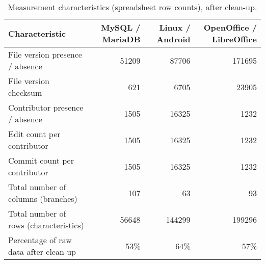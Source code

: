 \begin{table}[H]
\caption{Measurement characteristics (spreadsheet row counts), after clean-up.}
\label{table:ch4_cleanup} 
\centering
\begin{tabu} to 
  \toprule
  Characteristic & MySQL / MariaDB & Linux / Android & OpenOffice / LibreOffice \\
  \midrule
  File version presence / absence & \num{51209} & \num{87706} & \num{171695} \\
  \midrule
  File version checksum & \num{621} & \num{6705} & \num{23905} \\
  \midrule
  Contributor presence / absence & \num{1505} & \num{16325} & \num{1232} \\
  \midrule
  Edit count per contributor & \num{1505} & \num{16325} & \num{1232} \\
  \midrule
  Commit count per contributor & \num{1505} & \num{16325} & \num{1232} \\
  \midrule
  Total number of columns (branches) & 107 & 63 & 93 \\
  \midrule
  Total number of rows (characteristics) & \num{56648} & \num{144299} & \num{199296} \\
  \midrule
  Percentage of raw data after clean-up & 53\% & 64\% & 57\% \\
  \bottomrule
\end{tabu}
\end{table}
